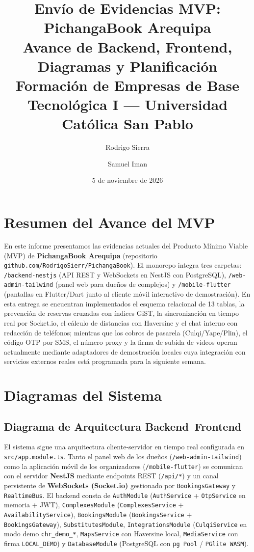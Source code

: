 \documentclass[10pt,a4paper]{article}
\title{\textbf{Envío de Evidencias MVP: PichangaBook Arequipa}\\
\large Avance de Backend, Frontend, Diagramas y Planificación\\
\normalsize Formación de Empresas de Base Tecnológica I --- Universidad Católica San Pablo}
\author{Rodrigo Sierra \and Samuel Iman}
\date{5 de noviembre de 2026}
\begin{document}
\maketitle

\section{Resumen del Avance del MVP}

En este informe presentamos las evidencias actuales del Producto Mínimo Viable (MVP) de \textbf{PichangaBook Arequipa} (repositorio \texttt{github.com/RodrigoSierr/PichangaBook}). El monorepo integra tres carpetas: \texttt{/backend-nestjs} (API REST y WebSockets en NestJS con PostgreSQL), \texttt{/web-admin-tailwind} (panel web para dueños de complejos) y \texttt{/mobile-flutter} (pantallas en Flutter/Dart junto al cliente móvil interactivo de demostración). En esta entrega se encuentran implementados el esquema relacional de 13 tablas, la prevención de reservas cruzadas con índices GiST, la sincronización en tiempo real por Socket.io, el cálculo de distancias con Haversine y el chat interno con redacción de teléfonos; mientras que los cobros de pasarela (Culqi/Yape/Plin), el código OTP por SMS, el número proxy y la firma de subida de videos operan actualmente mediante adaptadores de demostración locales cuya integración con servicios externos reales está programada para la siguiente semana.

\section{Diagramas del Sistema}

\subsection{Diagrama de Arquitectura Backend--Frontend}

El sistema sigue una arquitectura cliente-servidor en tiempo real configurada en \texttt{src/app.module.ts}. Tanto el panel web de los dueños (\texttt{/web-admin-tailwind}) como la aplicación móvil de los organizadores (\texttt{/mobile-flutter}) se comunican con el servidor \textbf{NestJS} mediante endpoints REST (\texttt{/api/*}) y un canal persistente de \textbf{WebSockets (Socket.io)} gestionado por \texttt{BookingsGateway} y \texttt{RealtimeBus}. El backend consta de \texttt{AuthModule} (\texttt{AuthService} + \texttt{OtpService} en memoria + JWT), \texttt{ComplexesModule} (\texttt{ComplexesService} + \texttt{AvailabilityService}), \texttt{BookingsModule} (\texttt{BookingsService} + \texttt{BookingsGateway}), \texttt{SubstitutesModule}, \texttt{IntegrationsModule} (\texttt{CulqiService} en modo demo \texttt{chr\_demo\_*}, \texttt{MapsService} con Haversine local, \texttt{MediaService} con firma \texttt{LOCAL\_DEMO}) y \texttt{DatabaseModule} (PostgreSQL con \texttt{pg Pool} / \texttt{PGlite WASM}).
\end{document}
